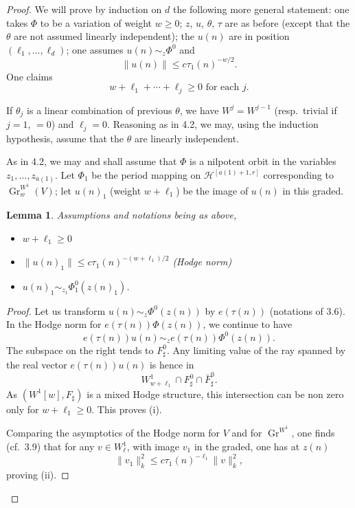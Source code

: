 \documentclass[11pt,a4paper]{article}
\theoremstyle{plain}
\newtheorem{lemma}[theorem]{Lemma}
\theoremstyle{definition}
\DeclareMathOperator{\Gr}{Gr}
\begin{document}
\begin{proof}
We will prove by induction on $d$ the following more general statement: one takes $\Phi$ to be a variation of weight $w\geq 0$; $z$, $u$, $\theta$, $\tau$ are as before (except that the $\theta$ are not assumed linearly independent); the $u(n)$ are in position $(\ell_1,\dots,\ell_d)$; one assumes $u(n)\sim_z\Phi^0$ and
\[
\|u(n)\|\leq c\tau_1(n)^{-w/2}.
\]
One claims
\[
w+\ell_1+\cdots+\ell_j\geq 0\text{ for each }j.
\]

If $\theta_j$ is a linear combination of previous $\theta$, we have $W^j=W^{j-1}$ (resp.\ trivial if $j=1$, $=0$) and $\ell_j=0$. Reasoning as in 4.2, we may, using the induction hypothesis, assume that the $\theta$ are linearly independent.

As in 4.2, we may and shall assume that $\Phi$ is a nilpotent orbit in the variables $z_1,\dots,z_{a(1)}$. Let $\Phi_1$ be the period mapping on $\mathcal{H}^{[a(1)+1,r]}$ corresponding to $\Gr_w^{W^1}(V)$; let $u(n)_1$ (weight $w+\ell_1$) be the image of $u(n)$ in this graded.

\begin{lemma}\label{lem:induction}
Assumptions and notations being as above,
\begin{itemize}
\item[(i)] $w+\ell_1\geq 0$
\item[(ii)] $\|u(n)_1\|\leq c\tau_1(n)^{-(w+\ell_1)/2}$ (Hodge norm)
\item[(iii)] $u(n)_1\sim_{z_1}\Phi_1^0(z(n)_1)$.
\end{itemize}
\end{lemma}

\begin{proof}
Let us transform $u(n)\sim_z\Phi^0(z(n))$ by $e(\tau(n))$ (notations of 3.6). In the Hodge norm for $e(\tau(n))\Phi(z(n))$, we continue to have
\[
e(\tau(n))u(n)\sim_z e(\tau(n))\Phi^0(z(n)).
\]
The subspace on the right tends to $F_{\sharp}^0$. Any limiting value of the ray spanned by the real vector $e(\tau(n))u(n)$ is hence in
\[
W^1_{w+\ell_1}\cap F_{\sharp}^0\cap\bar{F}_{\sharp}^0.
\]
As $(W^1[w],F_{\sharp})$ is a mixed Hodge structure, this intersection can be non zero only for $w+\ell_1\geq 0$. This proves (i).

Comparing the asymptotics of the Hodge norm for $V$ and for $\Gr^{W^1}$, one finds (cf.\ 3.9) that for any $v\in W^1_{\ell}$, with image $v_1$ in the graded, one has at $z(n)$
\[
\|v_1\|_k^2\leq c\tau_1(n)^{-\ell_1}\|v\|_k^2,
\]
proving (ii).


\end{proof}
\end{proof}
\end{document}

